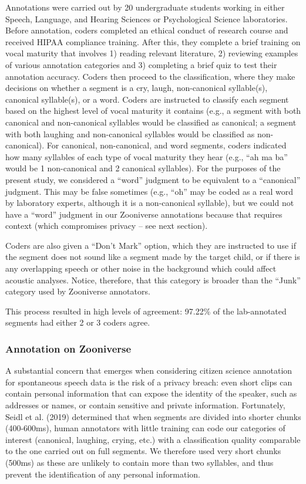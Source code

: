 \documentclass[english,,man,floatsintext]{apa6}
\begin{document}
Annotations were carried out by 20 undergraduate students working in either Speech, Language, and Hearing Sciences or Psychological Science laboratories. Before annotation, coders completed an ethical conduct of research course and received HIPAA compliance training. After this, they complete a brief training on vocal maturity that involves 1) reading relevant literature, 2) reviewing examples of various annotation categories and 3) completing a brief quiz to test their annotation accuracy. Coders then proceed to the classification, where they make decisions on whether a segment is a cry, laugh, non-canonical syllable(s), canonical syllable(s), or a word. Coders are instructed to classify each segment based on the highest level of vocal maturity it contains (e.g., a segment with both canonical and non-canonical syllables would be classified as canonical; a segment with both laughing and non-canonical syllables would be classified as non-canonical). For canonical, non-canonical, and word segments, coders indicated how many syllables of each type of vocal maturity they hear (e.g., \enquote{ah ma ba} would be 1 non-canonical and 2 canonical syllables). For the purposes of the present study, we considered a \enquote{word} judgment to be equivalent to a \enquote{canonical} judgment. This may be false sometimes (e.g., \enquote{oh} may be coded as a real word by laboratory experts, although it is a non-canonical syllable), but we could not have a \enquote{word} judgment in our Zooniverse annotations because that requires context (which compromises privacy -- see next section).

Coders are also given a \enquote{Don't Mark} option, which they are instructed to use if the segment does not sound like a segment made by the target child, or if there is any overlapping speech or other noise in the background which could affect acoustic analyses. Notice, therefore, that this category is broader than the \enquote{Junk} category used by Zooniverse annotators.

This process resulted in high levels of agreement: 97.22\% of the lab-annotated segments had either 2 or 3 coders agree.

\hypertarget{annotation-on-zooniverse}{%
\subsubsection{Annotation on Zooniverse}\label{annotation-on-zooniverse}}

A substantial concern that emerges when considering citizen science annotation for spontaneous speech data is the risk of a privacy breach: even short clips can contain personal information that can expose the identity of the speaker, such as addresses or names, or contain sensitive and private information. Fortunately, Seidl et al. (2019) determined that when segments are divided into shorter chunks (400-600ms), human annotators with little training can code our categories of interest (canonical, laughing, crying, etc.) with a classification quality comparable to the one carried out on full segments. We therefore used very short chunks (500ms) as these are unlikely to contain more than two syllables, and thus prevent the identification of any personal information.
\end{document}
